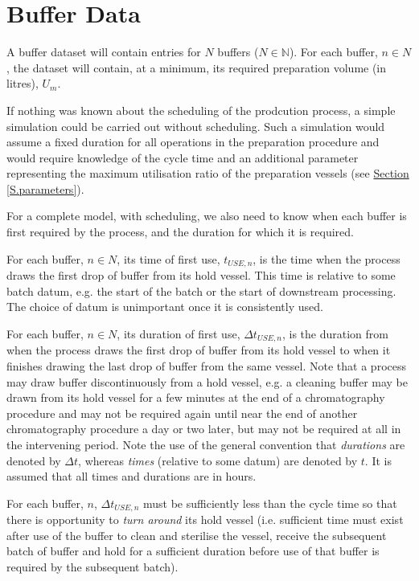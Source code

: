 \section{Buffer Data}\label{S.bufferdata}

A buffer dataset will contain entries for $N$ buffers ($N \in \mathbb{N}$).
For each buffer, $n \in N$, the dataset will contain, at a minimum, its
required preparation volume (in litres), $U_{m}$.

If nothing was known about the scheduling of the prodcution process, a simple
simulation could be carried out without scheduling.
Such a simulation would assume a fixed duration for all operations in the 
preparation procedure and would require knowledge of the cycle time and an
additional parameter representing the maximum utilisation ratio of the
preparation vessels (see \hyperref[S.parameters]{Section \ref*{S.parameters}}).

For a complete model, with scheduling, we also need to know when each buffer
is first required by the process, and the duration for which it is required.

For each buffer, $n \in N$, its time of first use, $t_{\mathit{USE},n}$, is the
time when the process draws the first drop of buffer from its hold vessel.
This time is relative to some batch datum, e.g. the start of the batch or the
start of downstream processing.
The choice of datum is unimportant once it is consistently used.

For each buffer, $n \in N$, its duration of first use, 
$\Delta t_{\mathit{USE},n}$, is the duration from when the process draws the
first drop of buffer from its hold vessel to when it finishes drawing the last
drop of buffer from the same vessel.
Note that a process may draw buffer discontinuously from a hold vessel, e.g. a
cleaning buffer may be drawn from its hold vessel for a few minutes at the end
of a chromatography procedure and may not be required again until near the end
of another chromatography procedure a day or two later, but may not be required
at all in the intervening period.
Note the use of the general convention that \emph{durations} are denoted by
$\Delta t$, whereas \emph{times} (relative to some datum) are denoted by $t$.
It is assumed that all times and durations are in hours.

For each buffer, $n$, $\Delta t_{\mathit{USE},n}$ must be sufficiently less
than the cycle time so that there is opportunity to \emph{turn around} its hold
vessel (i.e. sufficient time must exist after use of the buffer to clean and
sterilise the vessel, receive the subsequent batch of buffer and hold for a 
sufficient duration before use of that buffer is required by the subsequent
batch).

